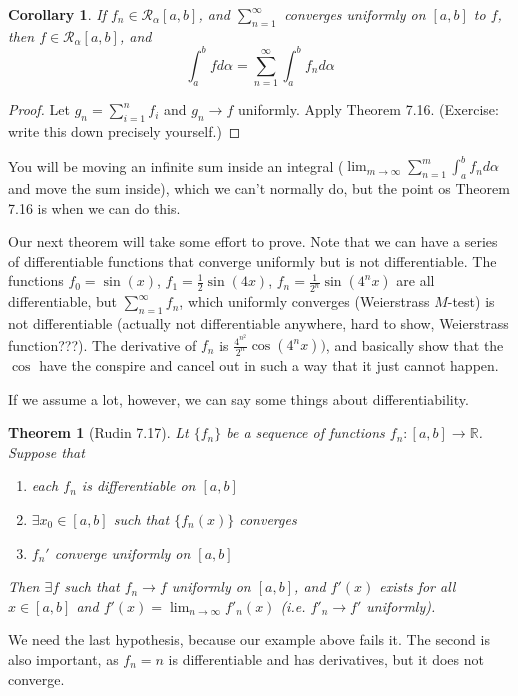 \documentclass{article}
\theoremstyle{plain}
\newtheorem{theorem}{Theorem}
\newtheorem{corollary}{Corollary}
\theoremstyle{remark}
\newcommand{\R}{{\mathbb R}}
\begin{document}
\begin{corollary}
	If $f_n \in \mathcal{R}_\alpha[a,b]$, and $\sum_{n=1}^\infty$
	converges uniformly on $[a,b]$ to $f$, then $f\in \mathcal{R}_\alpha[a,b]$, and
	\[
		\int_a^b fd\alpha = \sum_{n=1}^\infty \int_a^b f_nd\alpha
	\]
\end{corollary}
\begin{proof}
	Let $g_n = \sum_{i=1}^n f_i$ and $g_n \to f$ uniformly.
	Apply Theorem 7.16.
	(Exercise: write this down precisely yourself.)
\end{proof}
You will be moving an infinite sum inside an integral
($\lim_{m\to\infty}\sum_{n=1}^m \int_a^b f_nd\alpha$ and move the sum inside),
which we can't normally do, but the point os Theorem 7.16 is when we can do this.

Our next theorem will take some effort to prove.
Note that we can have a series of differentiable functions
that converge uniformly but is not differentiable.
The functions $f_0 = \sin(x)$, $f_1 = \frac12 \sin(4x)$, $f_n = \frac{1}{2^n} \sin(4^nx)$
are all differentiable,
but  $\sum_{n=1}^\infty f_n$, which uniformly converges
(Weierstrass $M$-test) is not differentiable
(actually not differentiable anywhere, hard to show, Weierstrass function???).
The derivative of $f_n$ is $\frac{4^{n^2}}{2^n}\cos(4^nx))$,
and basically show that the $\cos$ have the conspire and cancel out in such a way
that it just cannot happen.

If we assume a lot, however, we can say some things about differentiability.
\begin{theorem}[Rudin 7.17]
	Lt $\{f_n\}$ be a sequence of functions $f_n \colon [a,b] \to \R$.
	Suppose that
	\begin{enumerate}
		\item each $f_n$ is differentiable on $[a,b]$
		\item $\exists x_0 \in [a,b]$ such that $\{f_n(x)\}$ converges
		\item $f_n'$ converge uniformly on $[a,b]$
	\end{enumerate}
	Then $\exists f$ such that $f_n \to f$ uniformly on $[a,b]$,
	and $f'(x)$ exists for all $x\in[a,b]$ and $f'(x) = \lim_{n\to\infty} f'_n(x)$
	(i.e. $f'_n \to f'$ uniformly).
\end{theorem}
We need the last hypothesis, because our example above fails it.
The second is also important, as $f_n = n$ is differentiable and has derivatives,
but it does not converge.
\end{document}
